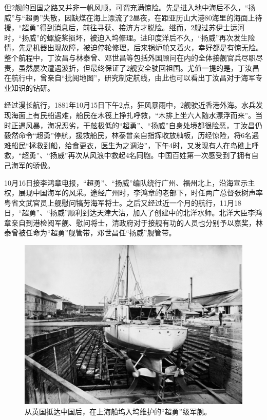 \documentclass[12pt,UTF8]{ctexbook}
\begin{document}
但2舰的回国之路又并非一帆风顺，可谓充满惊险。先是进入地中海后不久，“扬威”与“超勇”失散，因缺煤在海上漂流了2昼夜，在距亚历山大港80海里的海面上待援，“超勇”得到消息后，前往寻获、接济方才脱险。继而，2舰过苏伊士运河时，“扬威”的螺旋桨损坏，被迫入坞修理。进印度洋后不久，“扬威”再次发生险情，先是机器出现故障，被迫停轮修理，后来锅炉舱又着火，幸好都是有惊无险。整个航程中，丁汝昌与林泰曾、邓世昌等包括外国顾问在内的全体接舰官兵尽职尽责，虽然屡次遭遇波折，但最终保证了2舰安全驶回祖国。尤值一提的是，丁汝昌在航行中，曾亲自“批阅地图”，研究制定航线，由此也可以看出丁汝昌对于海军专业知识的钻研。

经过漫长航行，1881年10月15日下午2点，狂风暴雨中，2舰驶近香港外海。水兵发现海面上有民船遇难，船民在木筏上挣扎呼救，“木排上坐六人随水漂浮而来”。当时正遇风暴，海况恶劣，干舷极低的“超勇”、“扬威”自身处境都很险恶，丁汝昌仍毅然命令“超勇”停航，援救船民，林泰曾亲自指挥收放舢板，历经惊险，将6名遇难船民“拯救到船，给食更衣，医生为之调治”，下午4时，又发现有人在岛礁上呼救，“超勇”、“扬威”再次从风浪中救起4名同胞。中国百姓第一次感受到了拥有自己海军的骄傲。

10月16日接李鸿章电报，“超勇”、“扬威”编队绕行广州、福州北上，沿海宣示主权，展现中国海军的风采。途经广州时，李鸿章的老部下，时任两广总督张树声率粤省文武官员上舰慰问犒劳海军将士。之后又经过近一个月的航行，11月18日，“超勇”、“扬威”顺利到达天津大沽，加入了创建中的北洋水师。北洋大臣李鸿章亲自到港检阅军舰、慰问将士，清政府对于接舰有功的人员也分别予以嘉奖，林泰曾被任命为“超勇”舰管带，邓世昌任“扬威”舰管带。

\begin{figure}[htbp]
	\centering
	\includegraphics[width=1\linewidth]{Images/36}
	\caption{从英国抵达中国后，在上海船坞入坞维护的“超勇”级军舰。}
	\label{fig:1}
\end{figure}
\end{document}
